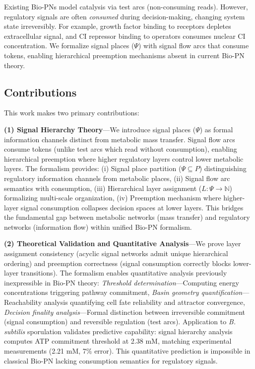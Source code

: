 \documentclass[twocolumn,11pt]{article}
\begin{document}
\noindent 
Existing Bio-PNs model catalysis via test arcs (non-consuming reads). However, regulatory signals are often \textit{consumed} during decision-making, changing system state irreversibly. For example, growth factor binding to receptors depletes extracellular signal, and CI repressor binding to operators consumes nuclear CI concentration. We formalize signal places ($\Psi$) with signal flow arcs that consume tokens, enabling hierarchical preemption mechanisms absent in current Bio-PN theory.

\subsection{Contributions}

This work makes two primary contributions:

\noindent\textbf{(1) Signal Hierarchy Theory}---We introduce signal places ($\Psi$) as formal information channels distinct from metabolic mass transfer. Signal flow arcs consume tokens (unlike test arcs which read without consumption), enabling hierarchical preemption where higher regulatory layers control lower metabolic layers. The formalism provides: (i) Signal place partition ($\Psi \subseteq P$) distinguishing regulatory information channels from metabolic places, (ii) Signal flow arc semantics with consumption, (iii) Hierarchical layer assignment ($L: \Psi \to \mathbb{N}$) formalizing multi-scale organization, (iv) Preemption mechanism where higher-layer signal consumption collapses decision spaces at lower layers. This bridges the fundamental gap between metabolic networks (mass transfer) and regulatory networks (information flow) within unified Bio-PN formalism.

\noindent\textbf{(2) Theoretical Validation and Quantitative Analysis}---We prove layer assignment consistency (acyclic signal networks admit unique hierarchical ordering) and preemption correctness (signal consumption correctly blocks lower-layer transitions). The formalism enables quantitative analysis previously inexpressible in Bio-PN theory: \textit{Threshold determination}---Computing energy concentrations triggering pathway commitment, \textit{Basin geometry quantification}---Reachability analysis quantifying cell fate reliability and attractor convergence, \textit{Decision finality analysis}---Formal distinction between irreversible commitment (signal consumption) and reversible regulation (test arcs). Application to \textit{B. subtilis} sporulation validates predictive capability: signal hierarchy analysis computes ATP commitment threshold at 2.38 mM, matching experimental measurements (2.21 mM, 7\% error). This quantitative prediction is impossible in classical Bio-PN lacking consumption semantics for regulatory signals.
\end{document}
